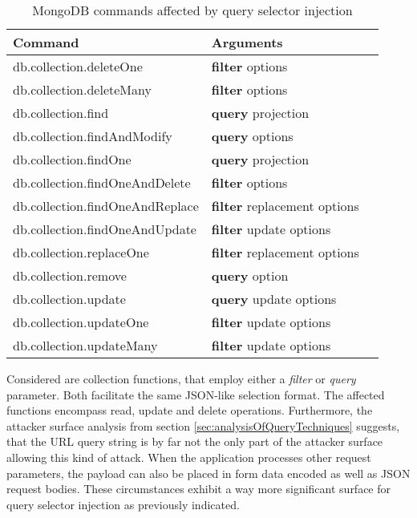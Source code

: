 \begin{table}[h]
 \sffamily
 \centering
 \begin{tabular}{lll}
  \textbf{Command} & \textbf{Arguments} \\ \hline
  db.collection.deleteOne         & \textbf{filter} options \\
  db.collection.deleteMany        & \textbf{filter} options \\
  db.collection.find              & \textbf{query} projection \\
  db.collection.findAndModify     & \textbf{query} options \\
  db.collection.findOne           & \textbf{query} projection \\
  db.collection.findOneAndDelete  & \textbf{filter} options \\
  db.collection.findOneAndReplace & \textbf{filter} replacement options \\
  db.collection.findOneAndUpdate  & \textbf{filter} update options \\
  db.collection.replaceOne        & \textbf{filter} replacement options \\
  db.collection.remove            & \textbf{query} option \\
  db.collection.update            & \textbf{query} update options \\
  db.collection.updateOne         & \textbf{filter} update options \\
  db.collection.updateMany        & \textbf{filter} update options \\
  \bottomrule 
 \end{tabular}
 \caption{MongoDB commands affected by query selector injection}
 \label{tab:mongo_commands_affected}
\end{table}

Considered are collection functions, that employ either a \emph{filter} or \emph{query} parameter. Both facilitate the same JSON-like selection format. The affected functions encompass read, update and delete operations. Furthermore, the attacker surface analysis from section \ref{sec:analysisOfQueryTechniques} suggests, that the URL query string is by far not the only part of the attacker surface allowing this kind of attack. When the application processes other request parameters, the payload can also be placed in form data encoded as well as JSON request bodies. These circumstances exhibit a way more significant surface for query selector injection as previously indicated. \\

